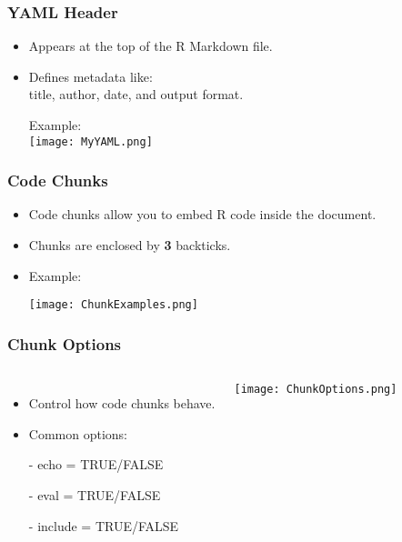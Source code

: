 \documentclass[xcolor=x11names,compress]{beamer}
\renewcommand{\(}{\begin{columns}}
\renewcommand{\)}{\end{columns}}
\newcommand{\<}[1]{\begin{column}{#1}}
\renewcommand{\>}{\end{column}}
\begin{document}
\begin{frame}
    \frametitle{YAML Header}
    \begin{itemize}[<+->]
        \item Appears at the top of the R Markdown file.
        \item Defines metadata like:\\
         title, author, date, and output format.
        \item[] Example: \\
        \texttt{[image: MyYAML.png]} %
   \end{itemize}
\end{frame}

\begin{frame}
    \frametitle{Code Chunks}
    \begin{itemize}[<+->]
        \item Code chunks allow you to embed R code inside the document.
        \item Chunks are enclosed by \textbf{3} backticks.
        \item Example:
      \item[]
       \texttt{[image: ChunkExamples.png]}

    \end{itemize}
\end{frame}


\begin{frame}
    \frametitle{Chunk Options}
    \begin{columns}
            \begin{itemize}[<+->]
                \item Control how code chunks behave.
                \item Common options:
                \item[-] echo = TRUE/FALSE
                \item[-] eval = TRUE/FALSE
                \item[-] include = TRUE/FALSE

            \end{itemize}
            \texttt{[image: ChunkOptions.png]}
    \end{columns}
\end{frame}
\end{document}

